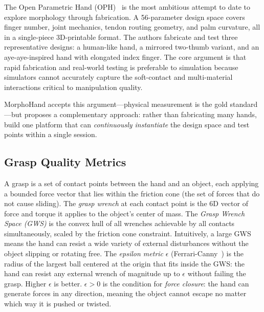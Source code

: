 \documentclass[journal]{IEEEtran}
\newcommand{\eps}{\epsilon}
\begin{document}
The Open Parametric Hand (OPH)~\cite{gilday2025parametric} is the most ambitious attempt
to date to explore morphology through fabrication.
A 56-parameter design space covers finger number, joint mechanics, tendon routing geometry,
and palm curvature, all in a single-piece 3D-printable format.
The authors fabricate and test three representative designs: a human-like hand, a mirrored
two-thumb variant, and an aye-aye-inspired hand with elongated index finger.
The core argument is that rapid fabrication and real-world testing is preferable to
simulation because simulators cannot accurately capture the soft-contact and
multi-material interactions critical to manipulation quality.

MorphoHand accepts this argument---physical measurement is the gold standard---but proposes
a complementary approach: rather than fabricating many hands, build one platform that can
\emph{continuously instantiate} the design space and test points within a single session.

\subsection{Grasp Quality Metrics}
\label{sec:related_gws}

\begin{notebox}
A grasp is a set of contact points between the hand and an object, each applying a bounded
force vector that lies within the friction cone (the set of forces that do not cause
sliding).
The \emph{grasp wrench} at each contact point is the 6D vector of force and torque it
applies to the object's center of mass.
The \emph{Grasp Wrench Space (GWS)} is the convex hull of all wrenches achievable by
all contacts simultaneously, scaled by the friction cone constraint.
Intuitively, a large GWS means the hand can resist a wide variety of external disturbances
without the object slipping or rotating free.
The \emph{epsilon metric} $\eps$ (Ferrari-Canny~\cite{ferrari1992planning}) is the radius
of the largest ball centered at the origin that fits inside the GWS:
the hand can resist any external wrench of magnitude up to $\eps$ without failing the grasp.
Higher $\eps$ is better. $\eps > 0$ is the condition for \emph{force closure}: the hand
can generate forces in any direction, meaning the object cannot escape no matter which
way it is pushed or twisted.
\end{notebox}
\end{document}
